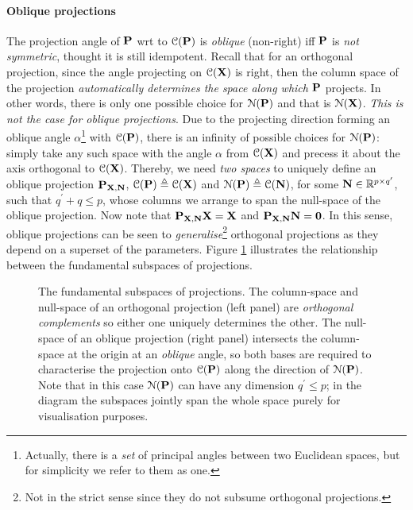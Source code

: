       \paragraph{Oblique projections} The projection angle of $\mathbf{P}$ wrt to $\mathcal{C}(\mathbf{P})$ is \textit{oblique} (non-right) iff $\mathbf{P}$ is \emph{not symmetric}, thought it is still idempotent. Recall that for an orthogonal projection, since the angle projecting on $\mathcal{C}(\mathbf{X})$ is right, then the column space of the projection \emph{automatically determines the space along which} $\mathbf{P}$ projects. In other words, there is only one possible choice for $\mathcal{N}(\mathbf{P})$ and that is $\mathcal{N}(\mathbf{X})$. \emph{This is not the case for oblique projections}. Due to the projecting direction forming an oblique angle $\alpha$\footnote{Actually, there is a \textit{set} of principal angles between two Euclidean spaces, but for simplicity we refer to them as one.} with $\mathcal{C}(\mathbf{P})$, there is an infinity of possible choices for $\mathcal{N}(\mathbf{P})$: simply take any such space with the angle $\alpha$ from $\mathcal{C}(\mathbf{X})$ and precess it about the axis orthogonal to $\mathcal{C}(\mathbf{X})$. Thereby, we need \textit{two spaces} to uniquely define an oblique projection $\mathbf{P}_{\mathbf{X},\mathbf{N}}$, $\mathcal{C}(\mathbf{P}) \triangleq \mathcal{C}(\mathbf{X})$ and $\mathcal{N}(\mathbf{P}) \triangleq \mathcal{C}(\mathbf{N})$, for some $\mathbf{N} \in \mathbb{R}^{p \times q^\prime}$, such that $q^\prime + q \leq p$, whose columns we arrange to span the null-space of the oblique projection. Now note that $\mathbf{P}_{\mathbf{X},\mathbf{N}} \mathbf{X} = \mathbf{X}$ and $\mathbf{P}_{\mathbf{X},\mathbf{N}} \mathbf{N} = \mathbf{0}$. In this sense, oblique projections can be seen to \textit{generalise}\footnote{Not in the strict sense since they do not subsume orthogonal projections.} orthogonal projections as they depend on a superset of the parameters. Figure \ref{fig:projections} illustrates the relationship between the fundamental subspaces of projections.

      \begin{figure}[!htbp]
	\centering
	\caption[The fundamental subspaces of projections.]{ \label{fig:projections}
	  The fundamental subspaces of projections. The column-space and null-space of an orthogonal projection (left panel) are \textit{orthogonal complements} so either one uniquely determines the other. The null-space of an oblique projection (right panel) intersects the column-space at the origin at an \emph{oblique} angle, so both bases are required to characterise the projection onto $\mathcal{C}(\mathbf{P})$ along the direction of $\mathcal{N}(\mathbf{P})$. Note that in this case $\mathcal{N}(\mathbf{P})$ can have any dimension $q^\prime \leq p$; in the diagram the subspaces jointly span the whole space purely for visualisation purposes.
	}
      \end{figure}

